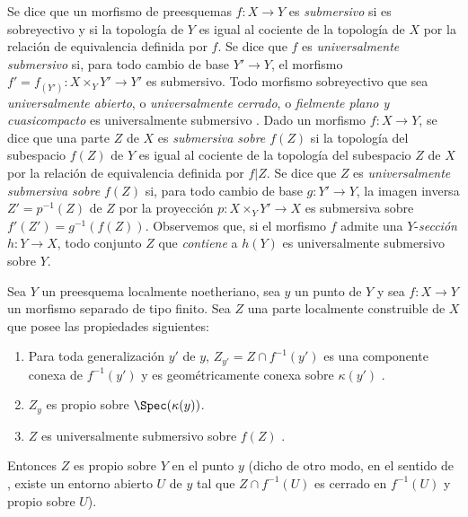\begin{env}[15.7.8]
\label{IV.15.7.8}
Se dice que un morfismo de preesquemas $f:X\to Y$ es \emph{submersivo} si es sobreyectivo y si la topología de $Y$ es igual al cociente de la topología de $X$ por la relación de equivalencia definida por $f$.
Se dice que $f$ es \emph{universalmente submersivo} si, para todo cambio de base $Y'\to Y$, el morfismo $f'=f_{(Y')}:X\times_Y Y'\to Y'$ es submersivo.
Todo morfismo sobreyectivo que sea \emph{universalmente abierto}, o \emph{universalmente cerrado}, o \emph{fielmente plano y cuasicompacto} es universalmente submersivo .
Dado un morfismo $f:X\to Y$, se dice que una parte $Z$ de $X$ es \emph{submersiva sobre $f(Z)$} si la topología del subespacio $f(Z)$ de $Y$ es igual al cociente de la topología del subespacio $Z$ de $X$ por la relación de equivalencia definida por $f|Z$.
Se dice que $Z$ es \emph{universalmente submersiva sobre $f(Z)$} si, para todo cambio de base $g:Y'\to Y$, la imagen inversa $Z'=p^{-1}(Z)$ de $Z$ por la proyección $p:X\times_Y Y'\to X$ es submersiva sobre $f'(Z')=g^{-1}(f(Z))$.
Observemos que, si el morfismo $f$ admite una $Y$-\emph{sección} $h:Y\to X$, todo conjunto $Z$ que \emph{contiene} a $h(Y)$ es universalmente submersivo sobre $Y$.
\end{env}

\begin{proposition}[15.7.9]
\label{IV.15.7.9}
Sea $Y$ un preesquema localmente noetheriano, sea $y$ un punto de $Y$ y sea $f:X\to Y$ un morfismo separado de tipo finito.
Sea $Z$ una parte localmente construible de $X$ que posee las propiedades siguientes:
\begin{enumerate}[label=(\roman*)]
  \item Para toda generalización $y'$ de $y$, $Z_{y'}=Z\cap f^{-1}(y')$ es una componente conexa de $f^{-1}(y')$ y es geométricamente conexa sobre $\kappa(y')$ .
  \item $Z_y$ es propio sobre $\Spec(\kappa(y))$.
  \item $Z$ es universalmente submersivo sobre $f(Z)$ .
\end{enumerate}
Entonces $Z$ es propio sobre $Y$ en el punto $y$ (dicho de otro modo, en el sentido de , existe un entorno abierto $U$ de $y$ tal que $Z\cap f^{-1}(U)$ es cerrado en $f^{-1}(U)$ y propio sobre $U$).
\end{proposition}

